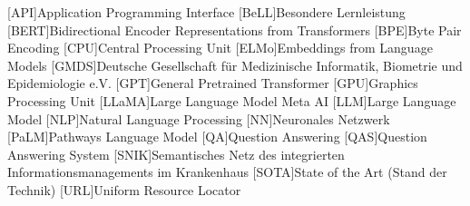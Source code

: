 \begin{acronym}[SPARQL]
    [API]{Application Programming Interface}
    [BeLL]{Besondere Lernleistung}
    [BERT]{Bidirectional Encoder Representations from Transformers}
    [BPE]{Byte Pair Encoding}
    [CPU]{Central Processing Unit}
    [ELMo]{Embeddings from Language Models}
    [GMDS]{Deutsche Gesellschaft für Medizinische Informatik, Biometrie und Epidemiologie e.V.}
    [GPT]{General Pretrained Transformer}
    [GPU]{Graphics Processing Unit}
    [LLaMA]{Large Language Model Meta AI}
    [LLM]{Large Language Model}
    [NLP]{Natural Language Processing}
    [NN]{Neuronales Netzwerk}
    [PaLM]{Pathways Language Model}
    [QA]{Question Answering}
    [QAS]{Question Answering System}
    [SNIK]{Semantisches Netz des integrierten Informationsmanagements im Krankenhaus}
    [SOTA]{State of the Art (Stand der Technik)}
    [URL]{Uniform Resource Locator}
\end{acronym}
